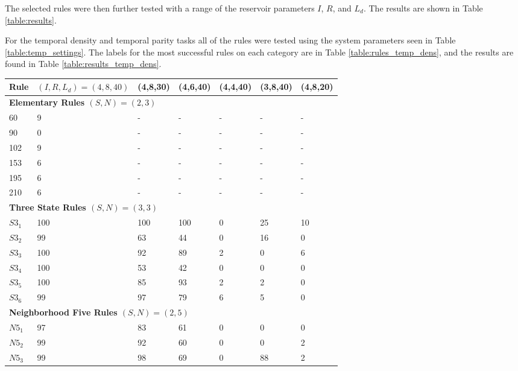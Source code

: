 \documentclass{elsarticle}
\begin{document}
\begin{multicols}{2}
The selected rules were then further tested with a range of the reservoir 
    parameters $I$, $R$, and $L_{d}$.  The results are shown in Table 
    \ref{table:results}. \par For the temporal density and temporal parity 
    tasks all of the rules were tested using the system parameters seen in 
    Table \ref{table:temp_settings}. The labels for the most successful rules 
    on each category are in Table \ref{table:rules_temp_dens}, and the results 
    are found in Table \ref{table:results_temp_dens}.



\begin{table}[!htbp] \centering
\small
\begin{tabular}{|l|l|l|l|l|l|l|}
\hline
\textbf{Rule} & \textbf{\boldmath$(I,R,L_{d})=(4,8,40)$} & \textbf{(4,8,30)} & 
\textbf{(4,6,40)} & \textbf{(4,4,40)} & \textbf{(3,8,40)} & \textbf{(4,8,20)} 
\\ \hline
\multicolumn{7}{|l|}{\textbf{Elementary Rules \boldmath$(S,N) = (2,3)$}} \\ 
\hline
60 & 9 & - & - & - & - & - \\ \hline
90 & 0 & - & - & - & - & - \\ \hline
102 & 9 & - & - & - & - & - \\ \hline
153 & 6 & - & - & - & - & - \\ \hline
195 & 6 & - & - & - & - & - \\ \hline
210 & 6 & - & - & - & - & - \\ \hline
\multicolumn{7}{|l|}{\textbf{Three State Rules \boldmath$(S,N) = (3,3)$}} \\ 
\hline
$S3_{1}$ & 100 & 100 & 100 & 0 & 25 & 10 \\ \hline
$S3_{2}$ & 99 & 63 & 44 & 0 & 16 & 0 \\ \hline
$S3_{3}$ & 100 & 92 & 89 & 2 & 0 & 6 \\ \hline
$S3_{4}$ & 100 & 53 & 42 & 0 & 0 & 0 \\ \hline
$S3_{5}$ & 100 & 85 & 93 & 2 & 2 & 0 \\ \hline
$S3_{6}$ & 99 & 97 & 79 & 6 & 5 & 0 \\ \hline
\multicolumn{7}{|l|}{\textbf{Neighborhood Five Rules \boldmath$(S,N) = (2,5)$}} 
\\ \hline
$N5_{1}$ & 97 & 83 & 61 & 0 & 0 & 0 \\ \hline
$N5_{2}$ & 99 & 92 & 60 & 0 & 0 & 2 \\ \hline
$N5_{3}$ & 99 & 98 & 69 & 0 & 88 & 2  \\ \hline

\end{tabular}
\end{table}
\end{multicols}
\end{document}
